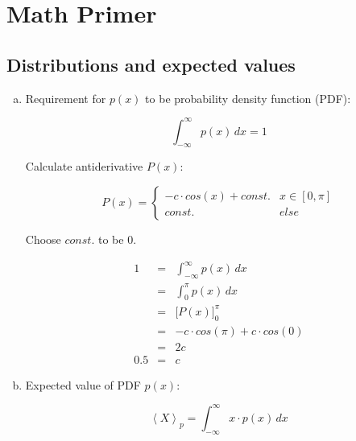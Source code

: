 \documentclass[11pt,a4paper]{article}
\begin{document}
\pagestyle{fancy}

\section{Math Primer}

\subsection{Distributions and expected values}

\begin{enumerate}[a)]

\item

Requirement for $p(x)$ to be probability density function (PDF):

\begin{displaymath}
\int_{-\infty}^{\infty} p(x) \, dx = 1
\end{displaymath}

Calculate antiderivative $P(x)$:

\begin{displaymath}
P(x) = \begin{cases}
-c \cdot cos(x) + const.   & x \in [0, \pi]\\
const.                      & else
\end{cases}
\end{displaymath}

Choose $const.$ to be $0$.

\begin{eqnarray*}
1   &   = & \int_{-\infty}^\infty p(x) \, dx\\
    &   = & \int_0^\pi p(x) \, dx\\
    &   = & \Big[ P(x) \Big]_0^\pi\\
    &   = & -c \cdot cos(\pi) + c \cdot cos(0)\\
    &   = & 2c\\
0.5 &   = & c
\end{eqnarray*}

\item

Expected value of PDF $p(x)$:

\begin{displaymath}
\left\langle X \right\rangle_p = \int_{-\infty}^\infty x \cdot p(x) \, dx
\end{displaymath}


\end{enumerate}
\end{document}
